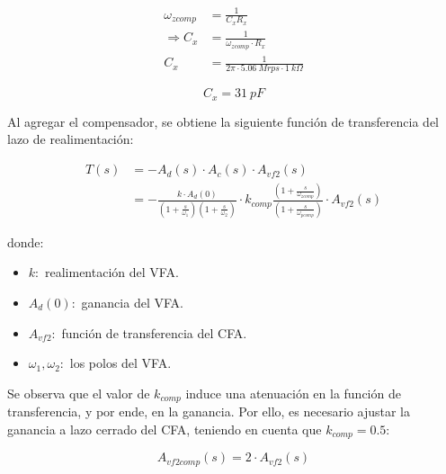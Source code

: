 \begin{equation}
    \begin{aligned}
              \omega_{zcomp} &= \frac{1}{C_x R_x}                     \\
        \Longrightarrow C_x &= \frac{1}{\omega_{zcomp} \cdot {R_x}}  \\
                        C_x &= \frac{1}{2\pi \cdot 5.06~Mrps \cdot 1~k\Omega}
    \end{aligned}
\end{equation}

\begin{equation}
    \boxed{
    C_x = 31~pF
    }
\end{equation}


\hspace{1mm} Al agregar el compensador, se obtiene la siguiente función de transferencia del lazo de realimentación:

\begin{equation}
    \begin{aligned}
        T(s) &= -A_d(s) \cdot A_c(s) \cdot A_{vf2} (s)\\
             &= - \frac{k\cdot A_d(0)}{\left(1+\frac{s}{\omega_1}\right)\left(1+\frac{s}{\omega_2}\right)} \cdot k_{comp} \frac{\left(1 + \frac{s}{\omega_{zcomp}}\right)}{\left(1+\frac{s}{\omega_{pcomp}}\right)} \cdot A_{vf2}(s)
    \end{aligned}
\end{equation}


\hspace{1mm} donde:

\begin{itemize}[itemsep=1pt]
    \item $k:$ realimentación del VFA.
    \item $A_d(0):$ ganancia del VFA.
    \item $A_{vf2}:$ función de transferencia del CFA.
    \item $ \omega_1 , \omega_2 :$ los polos del VFA.
\end{itemize}

\hspace{1mm} Se observa que el valor de $k_{comp}$ induce una atenuación en la función de transferencia, y por ende, en la ganancia. Por ello, es necesario ajustar la ganancia a lazo cerrado del CFA, teniendo en cuenta que $ k_{comp} = 0.5 $:

\begin{equation}
    A_{vf2 comp} (s) = 2\cdot A_{vf2}(s)
\end{equation}

